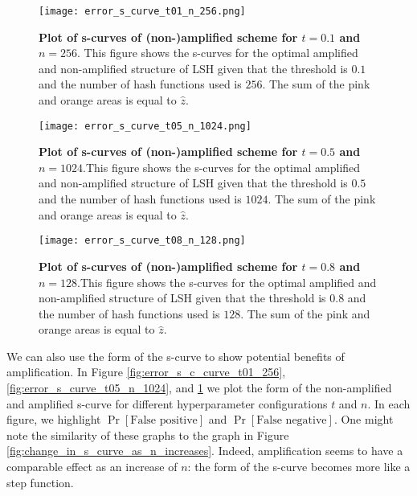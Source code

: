 \begin{figure}
    \centering
    \begin{minipage}[b]{0.49\textwidth}
    \texttt{[image: error\_s\_curve\_t01\_n\_256.png]}
    \caption[Plot of s-curves of (non-)amplified scheme for $t=0.1$ and $n=256$]{\textbf{Plot of s-curves of (non-)amplified scheme for $t=0.1$ and $n=256$}. This figure shows the s-curves for the optimal amplified and non-amplified structure of LSH given that the threshold is $0.1$ and the number of hash functions used is $256$. The sum of the pink and orange areas is equal to $\hat{z}$. }
    \label{fig:error_s_c_curve_t01_256}
    \end{minipage}
    \hfill 
    \begin{minipage}[b]{0.49\textwidth}
    \texttt{[image: error\_s\_curve\_t05\_n\_1024.png]}
    \caption[Plot of s-curves of (non-)amplified scheme for $t=0.5$ and $n=1024$]{\textbf{Plot of s-curves of (non-)amplified scheme for $t=0.5$ and $n=1024$}.This figure shows the s-curves for the optimal amplified and non-amplified structure of LSH given that the threshold is $0.5$ and the number of hash functions used is $1024$. The sum of the pink and orange areas is equal to $\hat{z}$. }
    \label{fig:error_s_curve_t05_n_1024}
\end{minipage}
    \texttt{[image: error\_s\_curve\_t08\_n\_128.png]}
    \caption[Plot of s-curves of (non-)amplified scheme for $t=0.8$ and $n=128$]{\textbf{Plot of s-curves of (non-)amplified scheme for $t=0.8$ and $n=128$}.This figure shows the s-curves for the optimal amplified and non-amplified structure of LSH given that the threshold is $0.8$ and the number of hash functions used is $128$. The sum of the pink and orange areas is equal to $\hat{z}$. }
    \label{fig:error_s_curve_t08_n_128}
\end{figure}

We can also use the form of the s-curve to show potential benefits of amplification. In Figure \ref{fig:error_s_c_curve_t01_256}, \ref{fig:error_s_curve_t05_n_1024}, and \ref{fig:error_s_curve_t08_n_128} we plot the form of the non-amplified and amplified s-curve for different hyperparameter configurations $t$ and $n$. In each figure, we highlight $\operatorname{Pr}[\text{False positive}]$ and $\operatorname{Pr}[\text{False negative}]$. 
One might note the similarity of these graphs to the graph in Figure \ref{fig:change_in_s_curve_as_n_increases}. Indeed, amplification seems to have a comparable effect as an increase of $n$: the form of the s-curve becomes more like a step function. 




